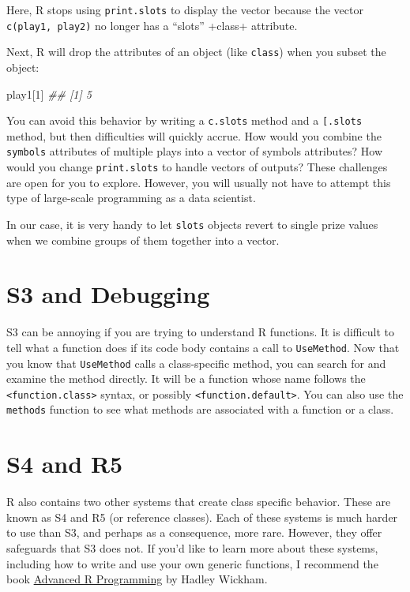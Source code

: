 \documentclass[
  letterpaper,
  DIV=11,
  numbers=noendperiod]{scrbook}
\newenvironment{Shaded}{\begin{snugshade}}{\end{snugshade}}
\newcommand{\DecValTok}[1]{\textcolor[rgb]{0.68,0.00,0.00}{#1}}
\newcommand{\DocumentationTok}[1]{\textcolor[rgb]{0.37,0.37,0.37}{\textit{#1}}}
\newcommand{\NormalTok}[1]{\textcolor[rgb]{0.00,0.23,0.31}{#1}}
\begin{document}
Here, R stops using \texttt{print.slots} to display the vector because
the vector \texttt{c(play1,\ play2)} no longer has a ``slots'' +class+
attribute.

Next, R will drop the attributes of an object (like \texttt{class}) when
you subset the object:

\begin{Shaded}
\begin{Highlighting}[]
\NormalTok{play1[}\DecValTok{1}\NormalTok{]}
\DocumentationTok{\#\# [1] 5}
\end{Highlighting}
\end{Shaded}

You can avoid this behavior by writing a \texttt{c.slots} method and a
\texttt{{[}.slots} method, but then difficulties will quickly accrue.
How would you combine the \texttt{symbols} attributes of multiple plays
into a vector of symbols attributes? How would you change
\texttt{print.slots} to handle vectors of outputs? These challenges are
open for you to explore. However, you will usually not have to attempt
this type of large-scale programming as a data scientist.

In our case, it is very handy to let \texttt{slots} objects revert to
single prize values when we combine groups of them together into a
vector.

\section{S3 and Debugging}\label{s3-and-debugging}

S3 can be annoying if you are trying to understand R functions. It is
difficult to tell what a function does if its code body contains a call
to \texttt{UseMethod}. Now that you know that \texttt{UseMethod} calls a
class-specific method, you can search for and examine the method
directly. It will be a function whose name follows the
\texttt{\textless{}function.class\textgreater{}} syntax, or possibly
\texttt{\textless{}function.default\textgreater{}}. You can also use the
\texttt{methods} function to see what methods are associated with a
function or a class.

\section{S4 and R5}\label{s4-and-r5}

R also contains two other systems that create class specific behavior.
These are known as S4 and R5 (or reference classes). Each of these
systems is much harder to use than S3, and perhaps as a consequence,
more rare. However, they offer safeguards that S3 does not. If you'd
like to learn more about these systems, including how to write and use
your own generic functions, I recommend the book
\href{http://adv-r.had.co.nz/}{Advanced R Programming} by Hadley
Wickham.
\end{document}
